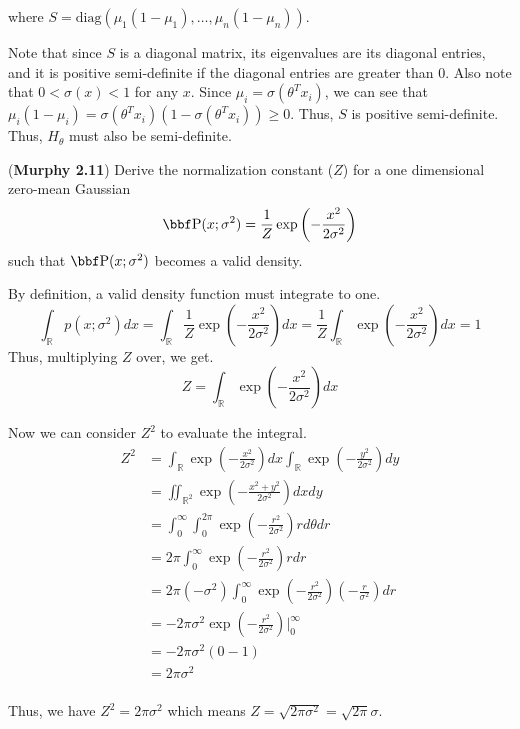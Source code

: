 \documentclass[12pt,letterpaper]{hmcpset}
\begin{document}
\begin{solution}
where $ S = \text{diag}(\mu_1(1 - \mu_1),\ldots,\mu_n(1 - \mu_n)) $.

Note that since $S$ is a diagonal matrix, its eigenvalues are its diagonal entries, and it is positive semi-definite if the diagonal entries are greater than 0. Also note that $0 < \sigma(x) < 1$ for any $x$. Since $\mu_i = \sigma(\theta^T x_i)$, we can see that $\mu_i(1 - \mu_i) = \sigma(\theta^T x_i)(1 - \sigma(\theta^T x_i)) \geq 0$. Thus, $S$ is positive semi-definite. Thus, $H_\theta$ must also be semi-definite.

\end{solution}
\newpage

\begin{problem}[2]
	(\textbf{Murphy 2.11})
	Derive the normalization constant ($Z$) for a one dimensional
	zero-mean Gaussian
	$$
	\PP(x; \sigma^2) = \frac{1}{Z}\exp\left(-\frac{x^2}{2\sigma^2}\right)
	$$
	such that $\PP(x; \sigma^2)$ becomes a valid density.
\end{problem}
\begin{solution}
	By definition, a valid density function must integrate to one.
$$
\int_{\mathbb{R}} p(x;\sigma^2)dx = \int_{\mathbb{R}} \frac{1}{Z} \exp \left(-\frac{x^2}{2\sigma^2}\right) dx = \frac{1}{Z} \int_{\mathbb{R}} \exp \left(-\frac{x^2}{2\sigma^2}\right) dx = 1
$$
Thus, multiplying $Z$ over, we get.
$$
Z = \int_{\mathbb{R}} \exp \left(-\frac{x^2}{2\sigma^2}\right) dx
$$

Now we can consider $Z^2$ to evaluate the integral.
\begin{align*}
	Z^2 &= \int_{\mathbb{R}} \exp \left(-\frac{x^2}{2\sigma^2}\right) dx \int_{\mathbb{R}} \exp \left(-\frac{y^2}{2\sigma^2}\right) dy\\
&= \iint_{\mathbb{R}^2} \exp \left(-\frac{x^2 + y^2}{2\sigma^2}\right) dx dy\\
&= \int_{0}^{\infty} \int_{0}^{2\pi} \exp \left(-\frac{r^2}{2\sigma^2}\right) r d\theta dr\\
&= 2\pi \int_{0}^{\infty} \exp \left(-\frac{r^2}{2\sigma^2}\right) r dr\\
&= 2\pi (-\sigma^2) \int_{0}^{\infty} \exp \left(-\frac{r^2}{2\sigma^2}\right) \left(-\frac{r}{\sigma^2}\right) dr\\
&= -2\pi\sigma^2 \exp \left(-\frac{r^2}{2\sigma^2}\right) \bigg|_{0}^{\infty}\\
&= -2\pi\sigma^2 (0 - 1)\\
&= 2\pi\sigma^2\\
\end{align*}

Thus, we have
$Z^2 = 2\pi\sigma^2$ which means $Z = \sqrt{2\pi\sigma^2} = \sqrt{2\pi}\sigma$.

\end{solution}
\newpage
\end{document}
